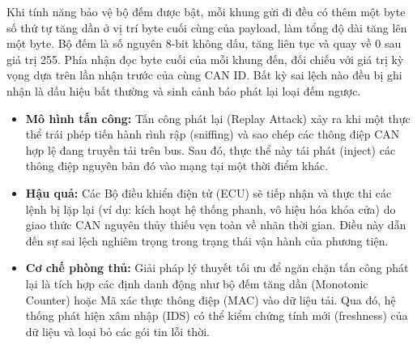 
Khi tính năng bảo vệ bộ đếm được bật, mỗi khung gửi đi đều có thêm một byte số
thứ tự tăng dần ở vị trí byte cuối cùng của payload, làm tổng độ dài tăng lên một
byte. Bộ đếm là số nguyên 8-bit không dấu, tăng liên tục và quay về 0 sau giá trị
255. Phía nhận đọc byte cuối của mỗi khung đến, đối chiếu với giá trị kỳ vọng dựa
trên lần nhận trước của cùng CAN ID. Bất kỳ sai lệch nào đều bị ghi nhận là dấu
hiệu bất thường và sinh cảnh báo phát lại loại đếm ngược.


\begin{itemize}[leftmargin=*]
    \item \textbf{Mô hình tấn công:} Tấn công phát lại (Replay Attack) xảy ra khi một thực thể trái phép tiến hành rình rập (sniffing) và sao chép các thông điệp CAN hợp lệ đang truyền tải trên bus. Sau đó, thực thể này tái phát (inject) các thông điệp nguyên bản đó vào mạng tại một thời điểm khác.
    \item \textbf{Hậu quả:} Các Bộ điều khiển điện tử (ECU) sẽ tiếp nhận và thực thi các lệnh bị lặp lại (ví dụ: kích hoạt hệ thống phanh, vô hiệu hóa khóa cửa) do giao thức CAN nguyên thủy thiếu vẹn toàn về nhãn thời gian. Điều này dẫn đến sự sai lệch nghiêm trọng trong trạng thái vận hành của phương tiện.
    \item \textbf{Cơ chế phòng thủ:} Giải pháp lý thuyết tối ưu để ngăn chặn tấn công phát lại là tích hợp các định danh động như bộ đếm tăng dần (Monotonic Counter) hoặc Mã xác thực thông điệp (MAC) vào dữ liệu tải. Qua đó, hệ thống phát hiện xâm nhập (IDS) có thể kiểm chứng tính mới (freshness) của dữ liệu và loại bỏ các gói tin lỗi thời.
\end{itemize}




